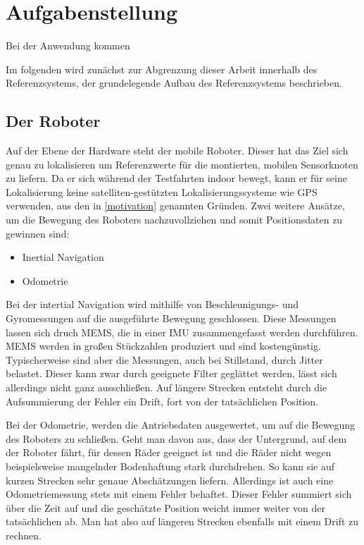 \section{Aufgabenstellung}
\label{sec:aufgabenstellung}

Bei der Anwendung kommen

Im folgenden wird zunächst zur Abgrenzung dieser Arbeit innerhalb des
Referenzsystems, der grundelegende Aufbau des Referenzsystems beschrieben. 

\subsection{Der Roboter}
\label{sub:roboter}

Auf der Ebene der Hardware steht der mobile Roboter. Dieser hat das Ziel sich
genau zu lokalisieren um Referenzwerte für die montierten, mobilen Sensorknoten zu
liefern. Da er sich während der Testfahrten indoor bewegt, kann er
für seine Lokalisierung keine satelliten-gestützten Lokalisierungssysteme wie
GPS verwenden, aus den in \ref{motivation} genannten Gründen. Zwei weitere
Ansätze, um die Bewegung des Roboters nachzuvollziehen und somit Positionsdaten
zu gewinnen sind:

\begin{itemize}
  \item Inertial Navigation
  \item Odometrie
\end{itemize}

Bei der intertial Navigation wird mithilfe von Beschleunigungs- und
Gyromessungen auf die ausgeführte Bewegung geschlossen. Diese Messungen lassen
sich druch \gls{MEMS}, die in einer 
\gls{IMU} zusammengefasst werden durchführen.
\gls{MEMS} werden in großen Stückzahlen produziert und sind kostengünstig.
Typischerweise sind aber die Messungen, auch bei Stillstand, durch Jitter belastet.
Dieser kann zwar durch geeignete Filter geglättet werden, lässt sich allerdings
nicht ganz ausschließen. Auf längere Strecken entsteht durch die Aufsummierung
der Fehler ein Drift, fort von der tatsächlichen Position.

Bei der Odometrie, werden die Antriebsdaten ausgewertet, um auf die Bewegung
des Roboters zu schließen. Geht man davon aus, dass der Untergrund, auf dem der
Roboter fährt, für dessen Räder geeignet ist und die Räder nicht wegen
beispielsweise mangelnder Bodenhaftung stark durchdrehen. So kann sie auf
kurzen Strecken sehr genaue Abschätzungen liefern. Allerdings ist auch eine
Odometriemessung stets mit einem Fehler behaftet. Dieser Fehler summiert sich
über die Zeit auf und die geschätzte Position weicht immer weiter von der
tatsächlichen ab. Man hat also auf längeren Strecken ebenfalls mit einem Drift
zu rechnen.

